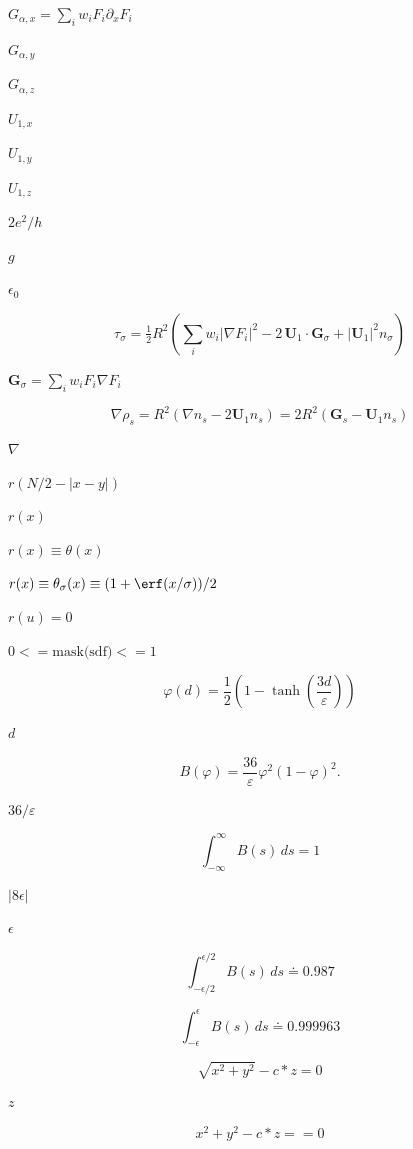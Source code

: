 \documentclass{article}
\begin{document}
$ G_{\alpha,x}=\sum_i w_iF_i\partial_xF_i $
\pagebreak

$ G_{\alpha,y} $
\pagebreak

$ G_{\alpha,z} $
\pagebreak

$ U_{1,x} $
\pagebreak

$ U_{1,y} $
\pagebreak

$ U_{1,z} $
\pagebreak

$ 2e^2/h $
\pagebreak

$ g $
\pagebreak

$\epsilon_0$
\pagebreak

\[ \tau_\sigma = \tfrac12 R^2\left(\sum_i w_i|\nabla F_i|^2
       - 2\,\mathbf U_1\!\cdot\!\mathbf G_\sigma + |\mathbf U_1|^2 n_\sigma\right) \]
\pagebreak

$ \mathbf G_\sigma=\sum_i w_iF_i\nabla F_i $
\pagebreak

\[ \nabla\rho_s = R^2(\nabla n_s - 2\mathbf U_1 n_s) = 2R^2(\mathbf G_s - \mathbf U_1 n_s) \]
\pagebreak

$ \nabla $
\pagebreak

$ r(N/2 - |x-y|) $
\pagebreak

$ r(x) $
\pagebreak

$ r(x) \equiv \theta(x)$
\pagebreak

$ r(x) \equiv \theta_\sigma(x) \equiv (1 + \erf(x/\sigma))/2 $
\pagebreak

$r(u) = 0$
\pagebreak

$0 <=  \mbox{mask(sdf)} <= 1$
\pagebreak

\[ \varphi(d) = \frac{1}{2}\left( 1 - \tanh\left(
                 \frac{3d}{\varepsilon} \right) \right) \]
\pagebreak

$d$
\pagebreak

\[ B(\varphi) = \frac{36}{\varepsilon} \varphi^2 (1-\varphi)^2. \]
\pagebreak

$36/\varepsilon$
\pagebreak

\[ \int_{-\infty}^\infty B(s) \, ds = 1 \]
\pagebreak

$ |8 \epsilon| $
\pagebreak

$ \epsilon $
\pagebreak

\[ \int_{-\epsilon/2}^{\epsilon/2} B(s) \, ds \doteq 0.987 \]
\pagebreak

\[ \int_{-\epsilon}^{\epsilon} B(s) \, ds \doteq 0.999963 \]
\pagebreak

\[ \sqrt{x^2 + y^2} - c * z = 0 \]
\pagebreak

$ z $
\pagebreak

\[ x^2 + y^2 - c * z == 0 \]
\pagebreak
\end{document}
